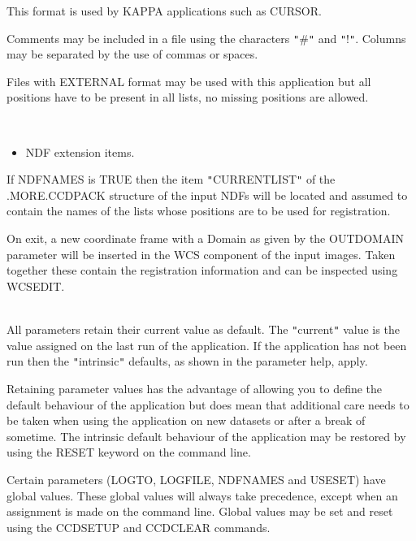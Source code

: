 \documentclass[twoside,11pt]{article}
\newcommand{\htmlref}[2]{#1}
\newcommand{\xref}[3]{#1}
\renewcommand{\_}{\texttt{\symbol{95}}}
\newcommand{\qt}[1]{{\tt "}#1{\tt "}}
\newcommand{\xroutine}[1]{\htmlref{{\sc #1}}{#1}}
\newcommand{\sstdiytopic}[2]{\item[#1:] \mbox{} \\[1.3ex] #2}
\newcommand{\sstitemlist}[1]{
  \mbox{} \\
  \vspace{-3.5ex}
  \begin{itemize}
     #1
  \end{itemize}
}
\newcommand{\sstitem}{\item}
\newcommand{\sstdiytopic}[2]{\item[{#1:}] #2 }
\newcommand{\sstitemlist}[1]{
      \begin{itemize}
         #1
      \end{itemize}
      \\
   }
\newcommand{\sstitem}{\item}
\begin{document}
{{{      }
        This format is used by KAPPA applications such as
        \xref{CURSOR}{sun95}{CURSOR}.

        Comments may be included in a file using the characters \qt{\#} and
        \qt{!}. Columns may be separated by the use of commas or spaces.

        Files with EXTERNAL format may be used with this application but
        all positions have to be present in all lists, no missing
        positions are allowed.

      \sstitemlist{

         \sstitem
         NDF extension items.

      }
        If NDFNAMES is TRUE then the item \qt{CURRENT\_LIST} of the
        .MORE.CCDPACK structure of the input NDFs will be located
        and assumed to contain the names of the lists whose positions
        are to be used for registration.

        On exit, a new coordinate frame with a Domain as given by the
        OUTDOMAIN parameter will be inserted in the WCS component of 
        the input images.  Taken together these contain the registration
        information and can be inspected using WCSEDIT.
   }
   \sstdiytopic{
      Behaviour of parameters
   } {
      All parameters retain their current value as default. The
      \qt{current} value is the value assigned on the last run of the
      application. If the application has not been run then the
      \qt{intrinsic} defaults, as shown in the parameter help, apply.

      Retaining parameter values has the advantage of allowing you to
      define the default behaviour of the application but does mean
      that additional care needs to be taken when using the application
      on new datasets or after a break of sometime.  The intrinsic
      default behaviour of the application may be restored by using the
      RESET keyword on the command line.

      Certain parameters (LOGTO, LOGFILE, NDFNAMES and USESET) have global
      values. These global values will always take precedence, except
      when an assignment is made on the command line.  Global values may
      be set and reset using the \xroutine{CCDSETUP} and \xroutine{CCDCLEAR} commands.
   }
}
\end{document}
